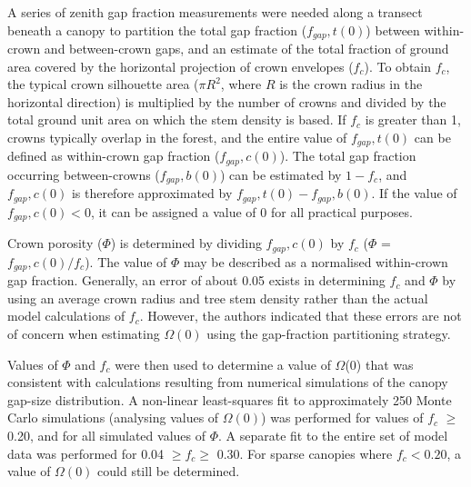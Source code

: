 A series of zenith gap fraction measurements were needed along a transect beneath a canopy to partition the total gap fraction ($f_{gap},t(0)$) between within-crown and between-crown gaps, and  an estimate of the total fraction of ground area covered by the horizontal projection of crown envelopes ($f_c$). To obtain $f_c$, the typical crown silhouette area ($\pi R^2$, where $R$ is the crown radius in the horizontal direction) is multiplied by the number of crowns and divided by the total ground unit area on which the stem density is based. If $f_c$ is greater than 1, crowns typically overlap in the forest, and the entire value of $f_{gap},t(0)$ can be defined as within-crown gap fraction ($f_{gap},c(0)$). The total gap fraction occurring between-crowns ($f_{gap},b(0)$) can be estimated by $1 - f_c$, and $f_{gap},c(0)$ is therefore approximated by $f_{gap},t(0) - f_{gap},b(0)$. If the value of $f_{gap},c(0) < 0$, it can be assigned a value of 0 for all practical purposes. 

Crown porosity ($\Phi$) is determined by dividing $f_{gap},c(0)$ by $f_c$ ($\Phi$ = $f_{gap},c(0)/f_c$). The value of $\Phi$ may be described as a normalised within-crown gap fraction. Generally, an error of about 0.05 exists in determining $f_c$ and $\Phi$ by using an average crown radius and tree stem density rather than the actual model calculations of $f_c$. However, the authors indicated that these errors are not of concern when estimating $\Omega(0)$ using the gap-fraction partitioning strategy.

Values of $\Phi$ and $f_c$ were then used to determine a value of $\Omega$(0) that was consistent with calculations resulting from numerical simulations of the canopy gap-size distribution. A non-linear least-squares fit to approximately 250 Monte Carlo simulations (analysing values of $\Omega(0)$) was performed for values of $f_c$ $\geq$ 0.20, and for all simulated values of $\Phi$. A separate fit to the entire set of model data was performed for 0.04 $\geq f_c \geq$ 0.30. For sparse canopies where $f_c < 0.20$, a value of $\Omega(0)$ could still be determined. 

